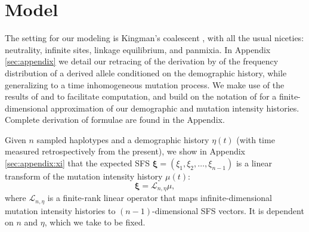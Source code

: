 \documentclass[11pt]{article}
\begin{document}

\section*{Model}\label{sec:model}

The setting for our modeling is Kingman's coalescent \citep{Kingman1982-ge, Kingman1982-tf, Kingman1982-ys, Kingman2000-jr}, with all the usual niceties: neutrality, infinite sites, linkage equilibrium, and panmixia.
In Appendix \ref{sec:appendix} we detail our retracing of the derivation by \cite{Griffiths1998-qf} of the frequency distribution of a derived allele conditioned on the demographic history, while generalizing to a time inhomogeneous mutation process.
We make use of the results of \cite{Polanski2003-kg} and \cite{Polanski2003-ll} to facilitate computation, and build on the notation of \cite{Rosen2018-bb} for a finite-dimensional approximation of our demographic and mutation intensity histories.
Complete derivation of formulae are found in the Appendix.

Given $n$ sampled haplotypes and a demographic history $\eta(t)$ (with time measured retrospectively from the present), we show in Appendix \ref{sec:appendix:xi} that the expected SFS $\boldsymbol \xi = (\xi_1, \xi_2,\dots, \xi_{n-1})$ is a linear transform of the mutation intensity history $\mu(t)$:
\begin{equation}
  \label{eqn:transform}
\boldsymbol \xi = \mathcal{L}_{n,\eta}\mu,
\end{equation}
where $\mathcal{L}_{n,\eta}$ is a finite-rank linear operator that maps infinite-dimensional mutation intensity histories to $(n-1)$-dimensional SFS vectors.
It is dependent on $n$ and $\eta$, which we take to be fixed.

\end{document}

